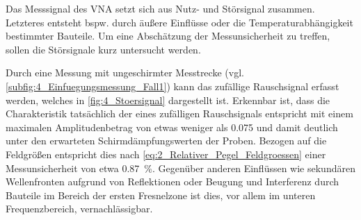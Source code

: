 

Das Messsignal des VNA setzt sich aus Nutz- und Störsignal zusammen. Letzteres entsteht bspw. durch äußere Einflüsse oder die Temperaturabhängigkeit bestimmter Bauteile. Um eine Abschätzung der Messunsicherheit zu treffen, sollen die Störsignale kurz untersucht werden.
\par
\vspace{\linespace}
Durch eine Messung mit ungeschirmter Messtrecke (vgl. \Abb\ref{subfig:4_Einfuegungsmessung_Fall1}) kann das zufällige Rauschsignal erfasst werden, welches in \Abb\ref{fig:4_Stoersignal} dargestellt ist. Erkennbar ist, dass die Charakteristik tatsächlich der eines zufälligen Rauschsignals entspricht mit einem maximalen Amplitudenbetrag von etwas weniger als \SI{0.075}{\Dezibel} und damit deutlich unter den erwarteten Schirmdämpfungswerten der Proben. Bezogen auf die Feldgrößen entspricht dies nach \Gleichung\eqref{eq:2_Relativer_Pegel_Feldgroessen} einer Messunsicherheit von etwa \SI{0.87}{\percent}. Gegenüber anderen Einflüssen wie sekundären Wellenfronten aufgrund von Reflektionen oder Beugung und Interferenz durch Bauteile im Bereich der ersten Fresnelzone ist dies, vor allem im unteren Frequenzbereich, vernachlässigbar. 
\par


